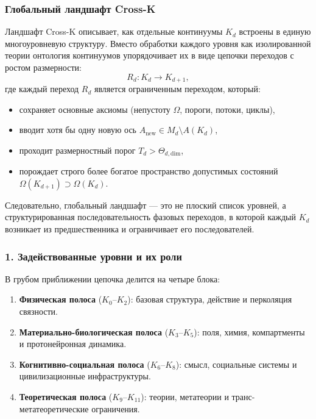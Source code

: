 
\subsubsection{Глобальный ландшафт Cross-K}
\label{sec:crossk-global-landscape}

Ландшафт Cross-K описывает, как отдельные континуумы $K_d$ встроены в единую
многоуровневую структуру. Вместо обработки каждого уровня как изолированной
теории онтология континуумов упорядочивает их в виде цепочки переходов с
ростом размерности:
\[
R_d : K_d \rightarrow K_{d+1},
\]
где каждый переход $R_d$ является ограниченным переходом, который:
\begin{itemize}
  \item сохраняет основные аксиомы (непустоту $\Omega$, пороги, потоки,
        циклы),
  \item вводит хотя бы одну новую ось
        $A_{\text{new}} \in M_d \setminus A(K_d)$,
  \item проходит размерностный порог $T_d > \Theta_{d,\text{dim}}$,
  \item порождает строго более богатое пространство допустимых состояний
        $\Omega(K_{d+1}) \supset \Omega(K_d)$.
\end{itemize}

Следовательно, глобальный ландшафт — это не плоский список уровней, а
структурированная последовательность фазовых переходов, в которой каждый
$K_d$ возникает из предшественника и ограничивает его последователей.

\subsubsection{1. Задействованные уровни и их роли}

В грубом приближении цепочка делится на четыре блока:
\begin{enumerate}
  \item \textbf{Физическая полоса} ($K_0$--$K_2$): базовая структура, действие и
        перколяция связности.
  \item \textbf{Материально-биологическая полоса} ($K_3$--$K_5$):
        поля, химия, компартменты и протонейронная динамика.
  \item \textbf{Когнитивно-социальная полоса} ($K_6$--$K_8$):
        смысл, социальные системы и цивилизационные инфраструктуры.
  \item \textbf{Теоретическая полоса} ($K_9$--$K_{11}$):
        теории, метатеории и транс-метатеоретические ограничения.
\end{enumerate}

